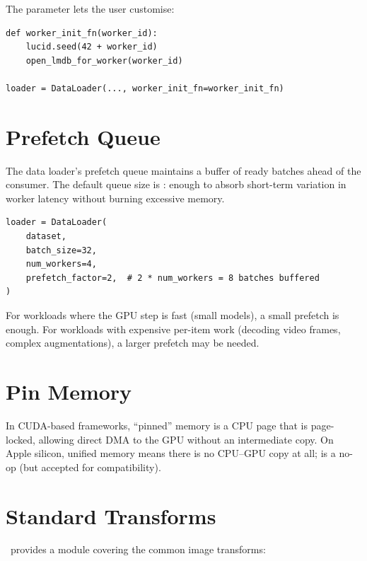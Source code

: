 The  parameter lets the user customise:

\begin{lstlisting}[style=lucid,language=LucidPython]
def worker_init_fn(worker_id):
    lucid.seed(42 + worker_id)
    open_lmdb_for_worker(worker_id)

loader = DataLoader(..., worker_init_fn=worker_init_fn)
\end{lstlisting}

\section{Prefetch Queue}
\label{sec:data_pipeline:prefetch_queue}

The data loader's prefetch queue maintains a buffer of ready
batches ahead of the consumer. The default queue size is
: enough to absorb short-term
variation in worker latency without burning excessive memory.

\begin{lstlisting}[style=lucid,language=LucidPython]
loader = DataLoader(
    dataset,
    batch_size=32,
    num_workers=4,
    prefetch_factor=2,  # 2 * num_workers = 8 batches buffered
)
\end{lstlisting}

For workloads where the GPU step is fast (small models), a
small prefetch is enough. For workloads with expensive per-item
work (decoding video frames, complex augmentations), a larger
prefetch may be needed.

\section{Pin Memory}
\label{sec:data_pipeline:pin_memory}

In CUDA-based frameworks, ``pinned'' memory is a CPU page that
is page-locked, allowing direct DMA to the GPU without an
intermediate copy. On Apple silicon, unified memory means there
is no CPU--GPU copy at all;  is a no-op
(but accepted for compatibility).

\section{Standard Transforms}
\label{sec:data_pipeline:standard_transforms}

\Lucid\ provides a  module
covering the common image transforms:

